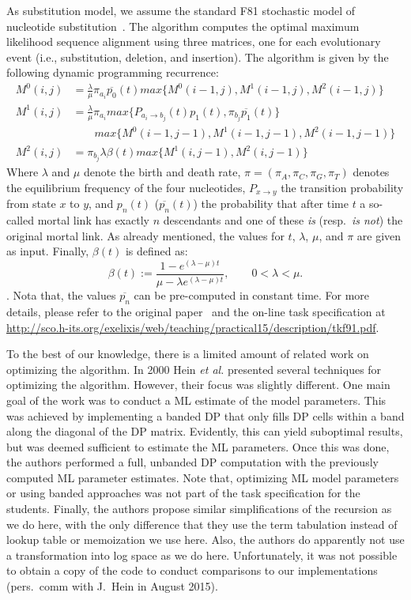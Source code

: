 \documentclass[runningheads,a4paper]{llncs}
\begin{document}
As substitution model, we assume the standard F81 stochastic model of nucleotide substitution~\cite{felsenstein1981evolutionary}.
The algorithm computes the optimal maximum likelihood sequence alignment using three matrices, one for each evolutionary event (i.e., substitution, deletion, and insertion).
The algorithm is given by the following dynamic programming recurrence:
\[
\begin{aligned}
  M^0(i,j)&=\frac{\lambda}{\mu}\pi_{a_i}\overline{p_0}(t)max\{M^0(i-1, j), M^1(i-1,j), M^2(i-1,j)\}\\
  M^1(i,j)&=\frac{\lambda}{\mu}\pi_{a_i}max\{P_{a_i \rightarrow b_j}(t) p_1(t), \pi_{b_j}\overline{p_1}(t)\}\\
          &\quad\quad max\{M^0(i-1, j-1), M^1(i-1,j-1), M^2(i-1,j-1)\}\\
  M^2(i,j)&=\pi_{b_j}\lambda\beta(t)max\{M^1(i,j-1), M^2(i,j-1)\}
\end{aligned}
\]
Where $\lambda$ and $\mu$ denote the birth and death rate, $\pi=(\pi_A,\pi_C,\pi_G,\pi_T)$ denotes the equilibrium frequency of the four nucleotides,
$P_{x \rightarrow y}$ the transition probability from state $x$ to $y$, and $p_n(t)$ ($\overline{p_n}(t)$) the probability that after time 
$t$ a so-called mortal link has exactly $n$ descendants and one of these {\em is} (resp.~{\em is not}) the original mortal link.
As already mentioned, the values for $t$, $\lambda$, $\mu$, and $\pi$ are given as input.
Finally, $\beta(t)$ is defined as:
$$\beta(t) := \frac{1 - e^{(\lambda-\mu)t}}{\mu - \lambda e^{(\lambda - \mu)t}}, \qquad 0 < \lambda < \mu.$$.
Nota that, the values $\overline{p_n}$ can be pre-computed in constant time. For more details, please refer to the original paper~\cite{felsenstein1981evolutionary} and the on-line
task specification at \url{http://sco.h-its.org/exelixis/web/teaching/practical15/description/tkf91.pdf}.

To the best of our knowledge, there is a limited amount of related work on optimizing the algorithm.
In 2000 Hein {\em et al.}\cite{hein2000statistical} presented several techniques for optimizing the algorithm. However, their focus was slightly different. One main
goal of the work was to conduct a ML estimate of the model parameters. This was achieved by implementing a banded DP that only fills DP cells
within a band along the diagonal of the DP matrix. Evidently, this can yield suboptimal results, but was deemed sufficient to estimate the ML parameters.
Once this was done, the authors performed a full, unbanded DP computation with the previously computed ML parameter estimates.
Note that, optimizing ML model parameters or using banded approaches was not part of the task specification for the students.
Finally, the authors propose similar simplifications of the recursion as we do here, with the only difference that they use
the term tabulation instead of lookup table or memoization we use here.
Also, the authors do apparently not use a transformation into log space as we do here. Unfortunately, it was not possible to obtain
a copy of the code to conduct comparisons to our implementations (pers.~comm with J.~Hein in August 2015).
\end{document}
